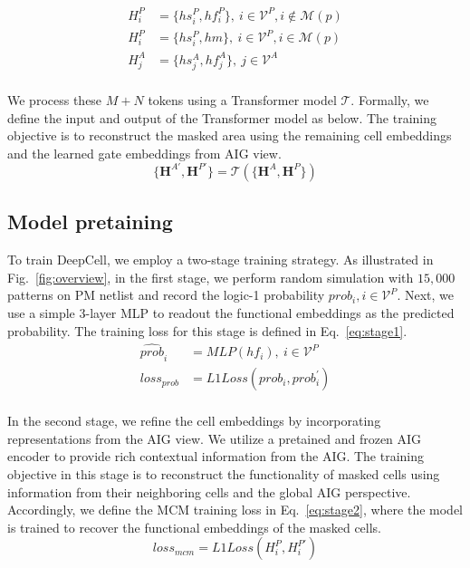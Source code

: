 \begin{equation} \label{eq:token}
    \begin{split}
        {H_i^P} & = \{hs_i^P, hf_i^P\}, ~i\in \mathcal{V}^P, i \notin \mathcal{M}(p) \\ 
        {H_i^P} & = \{hs_i^P, hm\}, ~i\in \mathcal{V}^P, i \in \mathcal{M}(p) \\ 
        {H_j^A} & = \{hs_j^A, hf_j^A\}, ~j\in \mathcal{V}^A \\ 
    \end{split}
\end{equation}

We process these $M+N$ tokens using a Transformer model $\mathcal{T}$. Formally, we define the input and output of the Transformer model as below. The training objective is to reconstruct the masked area using the remaining cell embeddings and the learned gate embeddings from AIG view. 
\begin{equation} \label{eq:transformer}
    \{\mathbf{H}^{A'}, \mathbf{H}^{P'}\} = \mathcal{T}(\{\mathbf{H}^A, \mathbf{H}^P\})
\end{equation}

\subsection{Model pretaining}
To train DeepCell, we employ a two-stage training strategy. As illustrated in Fig.~\ref{fig:overview}, in the first stage, we perform random simulation with $15,000$ patterns on PM netlist and record the logic-1 probability $prob_i, i \in \mathcal{V}^P$. Next, we use a simple 3-layer MLP to readout the functional embeddings as the predicted probability. The training loss for this stage is defined in Eq.~\eqref{eq:stage1}. 
\begin{equation} \label{eq:stage1}
    \begin{split}
        \hat{prob}_{i} & = MLP(hf_i),~i \in \mathcal{V}^P\\ 
        loss_{prob} & = L1Loss(prob_i, prob_{i}^{'}) \\ 
    \end{split}
\end{equation}

In the second stage, we refine the cell embeddings by incorporating representations from the AIG view. We utilize a pretained and frozen AIG encoder to provide rich contextual information from the AIG. The training objective in this stage is to reconstruct the functionality of masked cells using information from their neighboring cells and the global AIG perspective. Accordingly, we define the MCM training loss in Eq.~\eqref{eq:stage2}, where the model is trained to recover the functional embeddings of the masked cells. 
\begin{equation} \label{eq:stage2}
    loss_{mcm} = L1Loss(H_i^{P}, H_i^{P'})
\end{equation}

